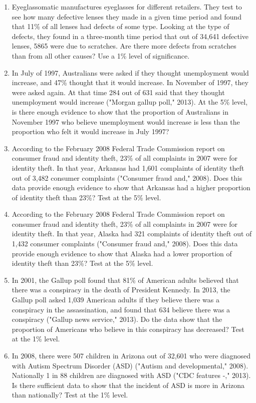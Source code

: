 \documentclass[]{book}
\begin{document}
\begin{enumerate}
\def\labelenumi{\arabic{enumi}.}
\item
  Eyeglassomatic manufactures eyeglasses for different retailers. They
  test to see how many defective lenses they made in a given time
  period and found that 11\% of all lenses had defects of some type.
  Looking at the type of defects, they found in a three-month time
  period that out of 34,641 defective lenses, 5865 were due to
  scratches. Are there more defects from scratches than from all other
  causes? Use a 1\% level of significance.
\item
  In July of 1997, Australians were asked if they thought unemployment
  would increase, and 47\% thought that it would increase. In November
  of 1997, they were asked again. At that time 284 out of 631 said
  that they thought unemployment would increase ("Morgan gallup
  poll," 2013). At the 5\% level, is there enough evidence to show
  that the proportion of Australians in November 1997 who believe
  unemployment would increase is less than the proportion who felt it
  would increase in July 1997?
\item
  According to the February 2008 Federal Trade Commission report on
  consumer fraud and identity theft, 23\% of all complaints in 2007
  were for identity theft. In that year, Arkansas had 1,601 complaints
  of identity theft out of 3,482 consumer complaints ("Consumer fraud
  and," 2008). Does this data provide enough evidence to show that
  Arkansas had a higher proportion of identity theft than 23\%? Test at
  the 5\% level.
\item
  According to the February 2008 Federal Trade Commission report on
  consumer fraud and identity theft, 23\% of all complaints in 2007
  were for identity theft. In that year, Alaska had 321 complaints of
  identity theft out of 1,432 consumer complaints ("Consumer fraud
  and," 2008). Does this data provide enough evidence to show that
  Alaska had a lower proportion of identity theft than 23\%? Test at
  the 5\% level.
\item
  In 2001, the Gallup poll found that 81\% of American adults believed
  that there was a conspiracy in the death of President Kennedy. In
  2013, the Gallup poll asked 1,039 American adults if they believe
  there was a conspiracy in the assassination, and found that 634
  believe there was a conspiracy ("Gallup news service," 2013). Do
  the data show that the proportion of Americans who believe in this
  conspiracy has decreased? Test at the 1\% level.
\item
  In 2008, there were 507 children in Arizona out of 32,601 who were
  diagnosed with Autism Spectrum Disorder (ASD) ("Autism and
  developmental," 2008). Nationally 1 in 88 children are diagnosed
  with ASD ("CDC features -," 2013). Is there sufficient data to
  show that the incident of ASD is more in Arizona than nationally?
  Test at the 1\% level.
\end{enumerate}
\end{document}
